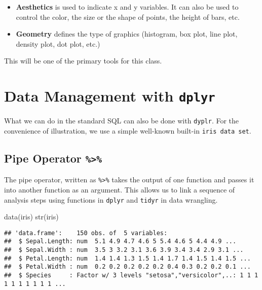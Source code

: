 \documentclass[
]{article}
\newenvironment{Shaded}{\begin{snugshade}}{\end{snugshade}}
\newcommand{\FunctionTok}[1]{\textcolor[rgb]{0.00,0.00,0.00}{#1}}
\newcommand{\NormalTok}[1]{#1}
\begin{document}
\begin{itemize}
\item
  \textbf{Aesthetics} is used to indicate x and y variables. It can also
  be used to control the color, the size or the shape of points, the
  height of bars, etc.
\item
  \textbf{Geometry} defines the type of graphics (histogram, box plot,
  line plot, density plot, dot plot, etc.)
\end{itemize}

This will be one of the primary tools for this class.

\hypertarget{data-management-with-dplyr}{%
\section{\texorpdfstring{Data Management with
\texttt{dplyr}}{Data Management with dplyr}}\label{data-management-with-dplyr}}

What we can do in the standard SQL can also be done with \texttt{dyplr}.
For the convenience of illustration, we use a simple well-known built-in
\texttt{iris\ data\ set}.

\hypertarget{pipe-operator}{%
\subsection{\texorpdfstring{Pipe Operator
\texttt{\%\textgreater{}\%}}{Pipe Operator \%\textgreater\%}}\label{pipe-operator}}

The pipe operator, written as \texttt{\%\textgreater{}\%} takes the
output of one function and passes it into another function as an
argument. This allows us to link a sequence of analysis steps using
functions in \texttt{dplyr} and \texttt{tidyr} in data wrangling.

\begin{Shaded}
\begin{Highlighting}[]
\FunctionTok{data}\NormalTok{(iris)}
\FunctionTok{str}\NormalTok{(iris)}
\end{Highlighting}
\end{Shaded}

\begin{verbatim}
## 'data.frame':    150 obs. of  5 variables:
##  $ Sepal.Length: num  5.1 4.9 4.7 4.6 5 5.4 4.6 5 4.4 4.9 ...
##  $ Sepal.Width : num  3.5 3 3.2 3.1 3.6 3.9 3.4 3.4 2.9 3.1 ...
##  $ Petal.Length: num  1.4 1.4 1.3 1.5 1.4 1.7 1.4 1.5 1.4 1.5 ...
##  $ Petal.Width : num  0.2 0.2 0.2 0.2 0.2 0.4 0.3 0.2 0.2 0.1 ...
##  $ Species     : Factor w/ 3 levels "setosa","versicolor",..: 1 1 1 1 1 1 1 1 1 1 ...
\end{verbatim}
\end{document}
